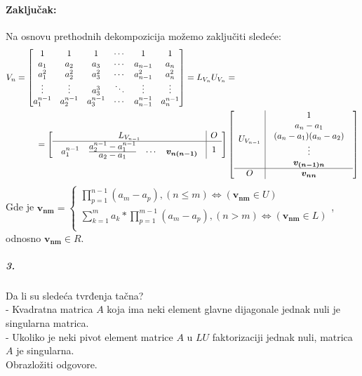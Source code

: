 \documentclass[11pt]{article}
\begin{document}
\paragraph*{Zaključak:}
Na osnovu prethodnih dekompozicija možemo zaključiti sledeće:\\
\begin{align*}
V_n=
\begin{bmatrix}
1 & 1 & 1 & \cdots & 1 & 1\\
a_1 & a_2 & a_3 & \cdots & a_{n-1} & a_n\\
a_1^2 & a_2^2 & a_3^2 & \cdots & a_{n-1}^2  & a_n^2\\
\vdots & \vdots & a_3^3 & \ddots & \vdots & \vdots\\
a_1^{n-1} & a_2^{n-1} &a_3^{n-1} & \cdots & a_{n-1}^{n-1} & a_n^{n-1}
\end{bmatrix}
=L_{V_n}U_{V_n}=\hspace*{5cm}\\
=\left[
\begin{array}{c|c}
L_{V_{n-1}} & O\\ \hline
\begin{array}{cccc}
a_1^{n-1} & \frac{\displaystyle{a_2^{n-1}-a_1^{n-1}}}{\displaystyle{a_2-a_1}} & \cdots & \boldsymbol{v_{n(n-1)}}
\end{array} & 1
\end{array}
\right]
\left[
\begin{array}{c|c}
U_{V_{n-1}} & \begin{array}{c}
1 \\ a_n-a_1 \\ (a_n-a_1)(a_n-a_2) \\ \vdots \\ \boldsymbol{v_{(n-1)n}}
\end{array}\\\hline
O & \boldsymbol{v_{nn}}
\end{array}
\right]\\
\end{align*}
Gde je $\boldsymbol{v_{nm}}=\begin{cases}\prod_{p=1}^{n-1} (a_m-a_p), (n\leq m)\iff (\boldsymbol{v_{nm}} \in U)\\
\sum_{k=1}^{m}a_k * \prod_{p=1}^{m-1} (a_m-a_p), (n> m) \iff (\boldsymbol{v_{nm}} \in L)\\
\end{cases}$, odnosno $\boldsymbol{v_{nm}}\in R.$
\subparagraph*{3.}
{Da li su sledeća tvrđenja tačna?\\
- Kvadratna matrica $A$ koja ima neki element glavne dijagonale jednak nuli je singularna
matrica.\\
- Ukoliko je neki pivot element matrice $A$ u $LU$ faktorizaciji jednak nuli, matrica $A$ je singularna.\\
Obrazložiti odgovore.}
\end{document}
